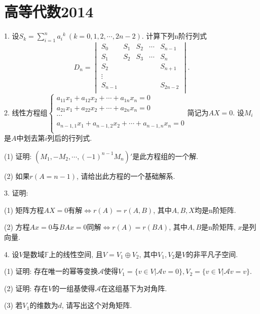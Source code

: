 \documentclass[12pt, a4paper, twoside]{ctexart}%
\begin{document}
{	\clearpage
	\section{高等代数2014}
	1. 设$S_k=\sum\limits_{i=1}^n {a_i}^k\ (k=0,1,2,\cdots,2n-2)$. 计算下列n阶行列式\[
	D_n=\begin{vmatrix}
		S_0&S_1&S_2&\cdots&S_{n-1}\\
		S_1&S_2&S_3&\cdots&S_n\\
		S_2& & & &S_{n+1}\\
		\vdots& & & & \\
		S_{n-1}& & & &S_{2n-2}\\
	\end{vmatrix}.\]
	2. 线性方程组$\begin{cases}
		a_{11}x_1+a_{12}x_2+\cdots+ a_{1n}x_n=0\\
		a_{21}x_1+a_{22}x_2+\cdots+ a_{2n}x_n=0\\
		\cdots\\
		a_{n-1,1}x_1+a_{n-1,2}x_2+\cdots+ a_{n-1,n}x_n=0\\
	\end{cases}$简记为$AX=0$. 设$M_i$是$A$中划去第$i$列后的行列式.\par
	\hspace{1.2em}(1) 证明: $(M_1,-M_2,\cdots,(-1)^{n-1}M_n)'$是此方程组的一个解.\par
	\hspace{1.2em}(2) 如果$r(A=n-1)$, 请给出此方程的一个基础解系.\par
	3. 证明: \par
	\hspace{1.2em}(1) 矩阵方程$AX=0$有解$\iff r(A)=r(A,B)$, 其中$A,B,X$均是n阶矩阵.\par
	\hspace{1.2em}(2) 方程$Ax=0$与$BAx=0$同解$\iff r(A)=r(BA)$, 其中$A,B$是n阶矩阵, $x$是列向量.\par
	4. 设$V$是数域$\mathbb{F}$上的线性空间, 且$V=V_1\oplus V_2$, 其中$V_1,V_2$是$V$的非平凡子空间.\par
	\hspace{1.2em}(1) 证明: 存在唯一的幂等变换$\mathscr{A}$使得$V_1=\{v\in V|\mathscr{A}v=0\}, V_2=\{v\in V|\mathscr{A}v=v\}.$\par
	\hspace{1.2em}(2) 证明: 存在$V$的一组基使得$\mathscr{A}$在这组基下为对角阵.\par
	\hspace{1.2em}(3) 若$V_1$的维数为$d$, 请写出这个对角矩阵.\par
}
\end{document}
